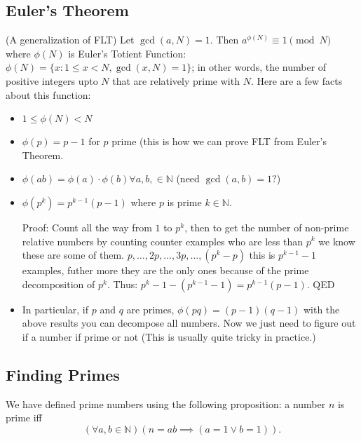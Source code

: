 \documentclass{article}
\begin{document}
\subsection*{Euler's Theorem}
    (A generalization of FLT) Let $\gcd(a, N) = 1$. Then $a^{\phi(N)} \equiv 1 \pmod{N}$ where $\phi(N)$ is Euler's Totient Function: $\phi(N) = \{x : 1 \le x < N, \gcd(x, N) = 1\}$; in other words, the number of positive integers upto $N$ that are relatively prime with $N$. Here are a few facts about this function:
    \begin{itemize}
       \item $1 \le \phi(N) < N$
       \item $\phi(p) = p - 1$ for $p$ prime (this is how we can prove FLT from Euler's Theorem.
       \item $\phi(ab) = \phi(a) \cdot \phi(b) \forall a, b, \in \mathbb{N}$ (need $\gcd(a, b) = 1?$)
       \item $\phi(p^{k}) = p^{k - 1}(p - 1)$ where $p$ is prime $k \in \mathbb{N}$.
       
       Proof: Count all the way from $1$ to $p^{k}$, then to get the number of non-prime relative numbers by counting counter examples who are less than $p^{k}$ we know these are some of them. $p, \dots, 2p, \dots, 3p, \dots, (p^{k} - p)$ this is $p^{k - 1} - 1$ examples, futher more they are the only ones because of the prime decomposition of $p^{k}$. Thus: $p^{k} - 1 - (p^{k -1} - 1) = p^{k - 1}(p - 1)$. QED
       \item In particular, if $p$ and $q$ are primes, $\phi(pq) = (p - 1)(q - 1)$ with the above results you can decompose all numbers. Now we just need to figure out if a number if prime or not (This is usually quite tricky in practice.)
    \end{itemize}

\subsection*{Finding Primes}
    We have defined prime numbers using the following proposition: a number $n$ is prime iff $$(\forall a, b \in \mathbb{N})(n = ab \implies (a = 1 \lor b = 1)).$$
    
\end{document}

